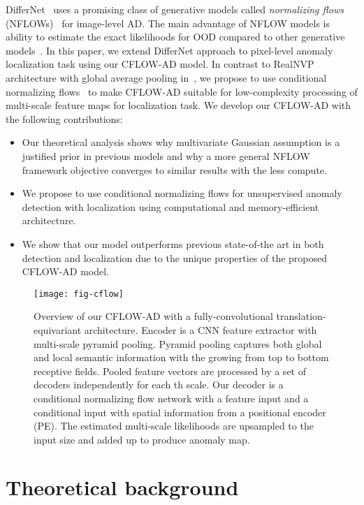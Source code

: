 \documentclass[10pt,twocolumn,letterpaper]{article}
\begin{document}
DifferNet~\cite{rudolph2020differnet} uses a promising class of generative models called \textit{normalizing flows} (NFLOWs)~\cite{45819} for image-level AD. The main advantage of NFLOW models is ability to estimate the exact likelihoods for OOD compared to other generative models~\cite{schlegl2019_fast_anogan, schlegl_anogan, c_baur_vae_gan, q_space_golkov, DFR2020}. In this paper, we extend DifferNet approach to pixel-level anomaly localization task using our CFLOW-AD model. In contrast to RealNVP~\cite{45819} architecture with global average pooling in~\cite{rudolph2020differnet}, we propose to use conditional normalizing flows~\cite{ardizzone2019guided} to make CFLOW-AD suitable for low-complexity processing of multi-scale feature maps for localization task. We develop our CFLOW-AD with the following contributions:
\begin{itemize}
	\itemsep0em
	\item Our theoretical analysis shows why multivariate Gaussian assumption is a justified prior in previous models and why a more general NFLOW framework objective converges to similar results with the less compute.
	\item We propose to use conditional normalizing flows for unsupervised anomaly detection with localization using computational and memory-efficient architecture.
	\item We show that our model outperforms previous state-of-the art in both detection and localization due to the unique properties of the proposed CFLOW-AD model.
\end{itemize}

\begin{figure*}[t]
	\centering
	\texttt{[image: fig-cflow]}
	\caption{Overview of our CFLOW-AD with a fully-convolutional translation-equivariant architecture. Encoder  is a CNN feature extractor with multi-scale pyramid pooling. Pyramid pooling captures both global and local semantic information with the growing from top to bottom receptive fields. Pooled feature vectors  are processed by a set of decoders  independently for each th scale. Our decoder is a conditional normalizing flow network with a feature input  and a conditional input  with spatial information from a positional encoder (PE). The estimated multi-scale likelihoods  are upsampled to the input size and added up to produce anomaly map.}
	\label{fig:cflow}
\end{figure*}

\section{Theoretical background}
\label{sec:theory}
\end{document}
